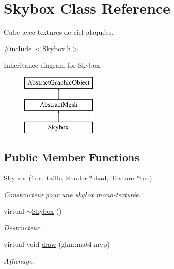 \hypertarget{classSkybox}{\section{Skybox Class Reference}
\label{classSkybox}
}


Cube avec textures de ciel plaquées.  




{\ttfamily \#include $<$Skybox.\-h$>$}

Inheritance diagram for Skybox\-:\begin{figure}[H]
\begin{center}
\leavevmode
\includegraphics[height=3.000000cm]{classSkybox}
\end{center}
\end{figure}
\subsection*{Public Member Functions}
\begin{DoxyCompactItemize}
\item 
\hypertarget{classSkybox_abe8add7195fe6ac462d83f5afb9d26a6}{\hyperlink{classSkybox_abe8add7195fe6ac462d83f5afb9d26a6}{Skybox} (float taille, \hyperlink{classShader}{Shader} $\ast$shad, \hyperlink{classTexture}{Texture} $\ast$tex)}\label{classSkybox_abe8add7195fe6ac462d83f5afb9d26a6}

\begin{DoxyCompactList}\small\item\em Constructeur pour une skybox mono-\/texturée. \end{DoxyCompactList}\item 
\hypertarget{classSkybox_a62ad4c6b4b1965a0a6d8536a50d4c090}{virtual \hyperlink{classSkybox_a62ad4c6b4b1965a0a6d8536a50d4c090}{$\sim$\-Skybox} ()}\label{classSkybox_a62ad4c6b4b1965a0a6d8536a50d4c090}

\begin{DoxyCompactList}\small\item\em Destructeur. \end{DoxyCompactList}\item 
\hypertarget{classSkybox_a07b12f1abc7c7b344ae5db0e3245d95a}{virtual void \hyperlink{classSkybox_a07b12f1abc7c7b344ae5db0e3245d95a}{draw} (glm\-::mat4 mvp)}\label{classSkybox_a07b12f1abc7c7b344ae5db0e3245d95a}

\begin{DoxyCompactList}\small\item\em Affichage. \end{DoxyCompactList}\end{DoxyCompactItemize}
